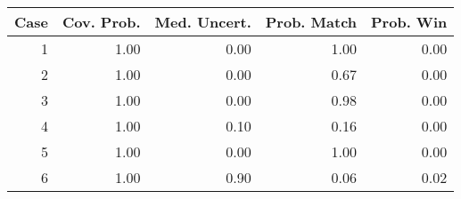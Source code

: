 \begin{tabular}{|r|rrrr|}
  \hline
Case & Cov. Prob. & Med. Uncert. & Prob. Match & Prob. Win \\ 
  \hline
1 & 1.00 & 0.00 & 1.00 & 0.00 \\ 
  2 & 1.00 & 0.00 & 0.67 & 0.00 \\ 
  3 & 1.00 & 0.00 & 0.98 & 0.00 \\ 
  4 & 1.00 & 0.10 & 0.16 & 0.00 \\ 
  5 & 1.00 & 0.00 & 1.00 & 0.00 \\ 
  6 & 1.00 & 0.90 & 0.06 & 0.02 \\ 
   \hline
\end{tabular}
